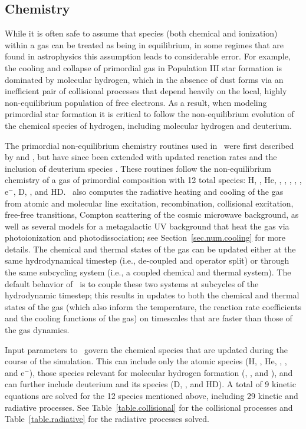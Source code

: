 \subsection{Chemistry}
\label{sec.num.chemistry}

While it is often safe to assume that species (both chemical and ionization)
within a gas can be treated as being in equilibrium, in some regimes that are
found in astrophysics this assumption leads to considerable error.  For
example, the cooling and collapse of primordial gas in Population III star
formation is dominated by molecular hydrogen, which in the absence of dust
forms via an inefficient pair of collisional processes that depend heavily on
the local, highly non-equilibrium population of free electrons.  As a result,
when modeling primordial star formation it is critical to follow the
non-equilibrium evolution of the chemical species of hydrogen, including
molecular hydrogen and deuterium.

The primordial non-equilibrium chemistry routines used in \enzo\ were first
described by \citet{abel97} and \citet{anninos97}, but have
since been extended with updated reaction rates and the inclusion of
deuterium species \citep{2009PhDT.........5T}.  These routines follow the
non-equilibrium chemistry of a gas of primordial composition with 12 total
species: H, \Hp, He, \Hep, \Hepp, \Hm, \HHp, \HH, e$^-$, D, \Dp, and HD.  \enzo\
also computes the radiative heating and cooling of the gas from atomic and
molecular line excitation, recombination, collisional excitation, free-free
transitions, Compton scattering of the cosmic microwave background, as well as
several models for a metagalactic UV background that heat the gas via
photoionization and photodissociation; see Section~\ref{sec.num.cooling} for
more details.  The chemical and thermal states of the gas can be updated either
at the same hydrodynamical timestep (i.e., de-coupled and operator split) or
through the same subcycling system (i.e., a coupled chemical and thermal
system).  The default behavior of \enzo\ is to couple these two systems at
subcycles of the hydrodynamic timestep; this results in updates to both the
chemical and thermal states of the gas (which also inform the temperature, the
reaction rate coefficients and the cooling functions of the gas) on timescales
that are faster than those of the gas dynamics.

Input parameters to \enzo\ govern the chemical species that are updated during
the course of the simulation.  This can include only the atomic species (H,
\Hp, He, \Hep, \Hepp, and e$^-$), those species relevant for molecular hydrogen
formation (\HH, \HHp, and \Hm), and can further include deuterium and its
species (D, \Dp, and HD).  A total of 9 kinetic equations are solved for the
12 species mentioned above, including
29 kinetic and radiative processes.  See
Table~\ref{table.collisional} for the collisional processes and
Table~\ref{table.radiative} for the radiative processes solved.

